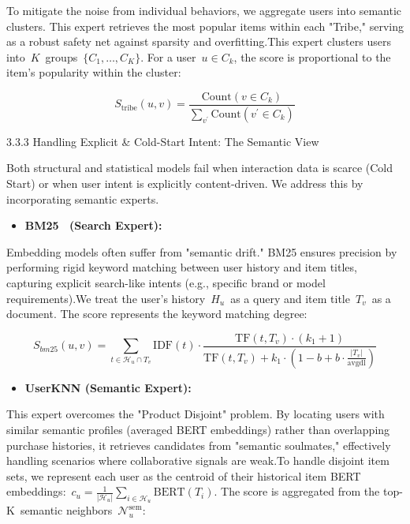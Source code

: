 \documentclass[]{article}
\begin{document}
To mitigate the noise from individual behaviors, we aggregate users into
semantic clusters. This expert retrieves the most popular items within
each "Tribe," serving as a robust safety net against sparsity and
overfitting.This expert clusters users
into~\(K\)~groups~\(\{ C_{1},\ldots,C_{K}\}\). For a
user~\(u \in C_{k}\), the score is proportional to the item's popularity
within the cluster:

\[S_{\text{tribe}}\left( u,v \right) = \frac{\text{Count}\left( v \in C_{k} \right)}{\sum_{v^{\prime}}^{}\text{Count}\left( v^{\prime} \in C_{k} \right)}\]

3.3.3 Handling Explicit \& Cold-Start Intent: The Semantic View

Both structural and statistical models fail when interaction data is
scarce (Cold Start) or when user intent is explicitly content-driven. We
address this by incorporating semantic experts.

\begin{itemize}
\item
  \textbf{BM25 ~(Search Expert):}
\end{itemize}

Embedding models often suffer from "semantic drift." BM25 ensures
precision by performing rigid keyword matching between user history and
item titles, capturing explicit search-like intents (e.g., specific
brand or model requirements).We treat the user's history~\(H_{u}\)~as a
query and item title~\(T_{v}\)~as a document. The score represents the
keyword matching degree:

\[S_{bm25}\left( u,v \right) = \sum_{t \in \mathcal{H}_{u} \cap T_{v}}^{}\text{IDF}\left( t \right) \cdot \frac{\text{TF}\left( t,T_{v} \right) \cdot \left( k_{1} + 1 \right)}{\text{TF}\left( t,T_{v} \right) + k_{1} \cdot \left( 1 - b + b \cdot \frac{\left| T_{v} \right|}{\text{avgdl}} \right)}\]

\begin{itemize}
\item
  \textbf{UserKNN (Semantic Expert):}
\end{itemize}

This expert overcomes the "Product Disjoint" problem. By locating users
with similar semantic profiles (averaged BERT embeddings) rather than
overlapping purchase histories, it retrieves candidates from "semantic
soulmates," effectively handling scenarios where collaborative signals
are weak.To handle disjoint item sets, we represent each user as the
centroid of their historical item BERT
embeddings:~\(c_{u} = \frac{1}{\left| \mathcal{H}_{u} \right|}\sum_{i \in \mathcal{H}_{u}}^{}\text{BERT}\left( T_{i} \right)\).
The score is aggregated from the top-K~semantic
neighbors~\(\mathcal{N}_{u}^{\text{sem}}\):
\end{document}
